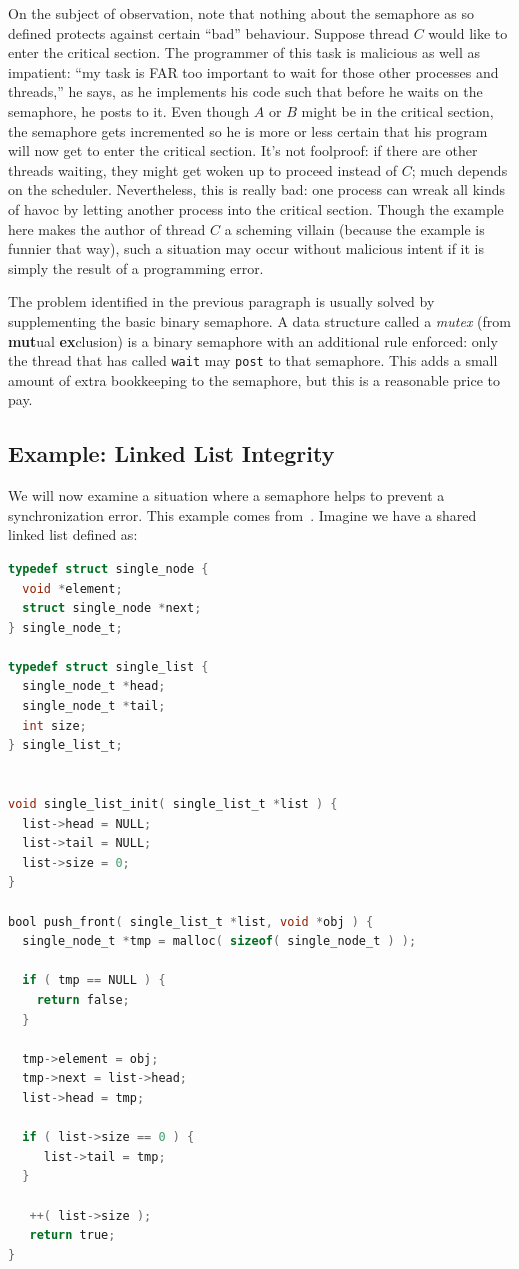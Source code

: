 On the subject of observation, note that nothing about the semaphore as so defined protects against certain ``bad'' behaviour. Suppose thread $C$ would like to enter the critical section. The programmer of this task is malicious as well as impatient: ``my task is FAR too important to wait for those other processes and threads,'' he says, as he implements his code such that before he waits on the semaphore, he posts to it. Even though $A$ or $B$ might be in the critical section, the semaphore gets incremented so he is more or less certain that his program will now get to enter the critical section. It's not foolproof: if there are other threads waiting, they might get woken up to proceed instead of $C$; much depends on the scheduler. Nevertheless, this is really bad: one process can wreak all kinds of havoc by letting another process into the critical section. Though the example here makes the author of thread $C$ a scheming villain (because the example is funnier that way), such a situation may occur without malicious intent if it is simply the result of a programming error.

The problem identified in the previous paragraph is usually solved by supplementing the basic binary semaphore. A data structure called a \textit{mutex} (from \textbf{mut}ual \textbf{ex}clusion) is a binary semaphore with an additional rule enforced: only the thread that has called \texttt{wait} may \texttt{post} to that semaphore. This adds a small amount of extra bookkeeping to the semaphore, but this is a reasonable price to pay.

\subsection*{Example: Linked List Integrity}
We will now examine a situation where a semaphore helps to prevent a synchronization error. This example comes from~\cite{mte241}. Imagine we have a shared linked list defined as:

\begin{lstlisting}[language=C]
typedef struct single_node {
  void *element;
  struct single_node *next;
} single_node_t;

typedef struct single_list {
  single_node_t *head;
  single_node_t *tail;
  int size;
} single_list_t;


void single_list_init( single_list_t *list ) {
  list->head = NULL;
  list->tail = NULL;
  list->size = 0;
}

bool push_front( single_list_t *list, void *obj ) {
  single_node_t *tmp = malloc( sizeof( single_node_t ) );
  
  if ( tmp == NULL ) {
    return false;
  }
  
  tmp->element = obj;
  tmp->next = list->head;
  list->head = tmp;

  if ( list->size == 0 ) {
     list->tail = tmp;
  }
  
   ++( list->size );
   return true;
}
\end{lstlisting}

